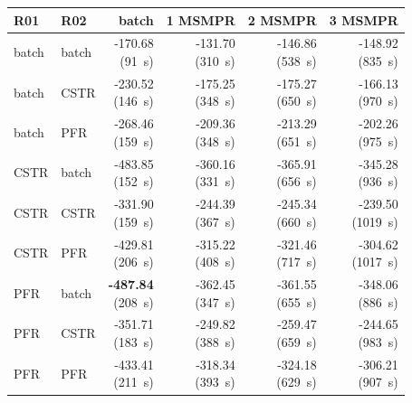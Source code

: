 \begin{tabular}{@{}llrrrr@{}}\toprule
R01 & R02 & batch & 1 MSMPR & 2 MSMPR & 3 MSMPR\\\midrule
batch & batch & \makecell{-170.68\\(91~s)} & \makecell{-131.70\\(310~s)} & \makecell{-146.86\\(538~s)} & \makecell{-148.92\\(835~s)} \\
batch & CSTR & \makecell{-230.52\\(146~s)} & \makecell{-175.25\\(348~s)} & \makecell{-175.27\\(650~s)} & \makecell{-166.13\\(970~s)} \\
batch & PFR & \makecell{-268.46\\(159~s)} & \makecell{-209.36\\(348~s)} & \makecell{-213.29\\(651~s)} & \makecell{-202.26\\(975~s)} \\
CSTR & batch & \makecell{-483.85\\(152~s)} & \makecell{-360.16\\(331~s)} & \makecell{-365.91\\(656~s)} & \makecell{-345.28\\(936~s)} \\
CSTR & CSTR & \makecell{-331.90\\(159~s)} & \makecell{-244.39\\(367~s)} & \makecell{-245.34\\(660~s)} & \makecell{-239.50\\(1019~s)} \\
CSTR & PFR & \makecell{-429.81\\(206~s)} & \makecell{-315.22\\(408~s)} & \makecell{-321.46\\(717~s)} & \makecell{-304.62\\(1017~s)} \\
PFR & batch & \makecell{\textbf{-487.84}\\(208~s)} & \makecell{-362.45\\(347~s)} & \makecell{-361.55\\(655~s)} & \makecell{-348.06\\(886~s)} \\
PFR & CSTR & \makecell{-351.71\\(183~s)} & \makecell{-249.82\\(388~s)} & \makecell{-259.47\\(659~s)} & \makecell{-244.65\\(983~s)} \\
PFR & PFR & \makecell{-433.41\\(211~s)} & \makecell{-318.34\\(393~s)} & \makecell{-324.18\\(629~s)} & \makecell{-306.21\\(907~s)} \\
\bottomrule\end{tabular}
